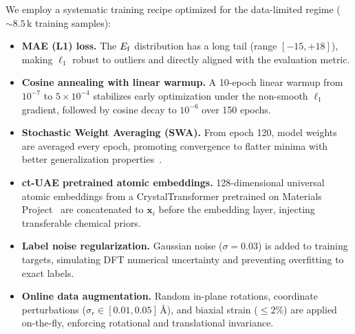 We employ a systematic training recipe optimized for the data-limited regime
(${\sim}8.5$\,k training samples):

\begin{itemize}
  \item \textbf{MAE (L1) loss.}
    The $E_\mathrm{f}$ distribution has a long tail (range $[-15, +18]$\eV{}),
    making $\ell_1$ robust to outliers and directly aligned with the
    evaluation metric.

  \item \textbf{Cosine annealing with linear warmup.}
    A 10-epoch linear warmup from $10^{-7}$ to $5\times10^{-4}$ stabilizes
    early optimization under the non-smooth $\ell_1$ gradient, followed by
    cosine decay to $10^{-6}$ over 150 epochs.

  \item \textbf{Stochastic Weight Averaging (SWA).}
    From epoch 120, model weights are averaged every epoch, promoting
    convergence to flatter minima with better generalization
    properties~\cite{swa2018}.

  \item \textbf{ct-UAE pretrained atomic embeddings.}
    128-dimensional universal atomic embeddings from a CrystalTransformer
    pretrained on Materials Project~\cite{ctuae2025} are concatenated to
    $\mathbf{x}_i$ before the embedding layer, injecting transferable
    chemical priors.

  \item \textbf{Label noise regularization.}
    Gaussian noise ($\sigma = 0.03$\eV{}) is added to training targets,
    simulating DFT numerical uncertainty and preventing overfitting to
    exact labels.

  \item \textbf{Online data augmentation.}
    Random in-plane rotations, coordinate perturbations
    ($\sigma_r \in [0.01, 0.05]$\,\AA{}), and biaxial strain
    ($\leq 2\%$) are applied on-the-fly, enforcing rotational and
    translational invariance.
\end{itemize}

